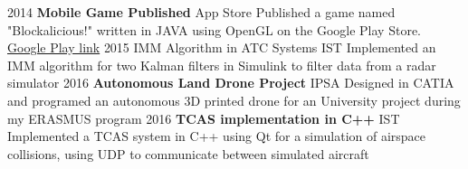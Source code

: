 \documentclass[]{friggeri-cv} %
\begin{document}
\begin{entrylist}


\entry
{2014}
{\textbf{Mobile Game Published}}
{App Store}
{Published a game named "Blockalicious!" written in JAVA using OpenGL on the Google Play Store. 
\href{https://play.google.com/store/apps/details?id=com.guiero.blockaliciousfinal}{Google Play link}}
\entry
{2015}
{IMM Algorithm in ATC Systems}
{IST}
{Implemented an IMM algorithm for two Kalman filters in Simulink to filter data from a radar simulator}
\entry
{2016}
{\textbf{Autonomous Land Drone Project}}
{IPSA}
{Designed in CATIA and programed an autonomous 3D printed drone for an University project during my ERASMUS program}
\entry
{2016}
{\textbf{TCAS implementation in C++}}
{IST}
{Implemented a TCAS system in C++ using Qt for a simulation of airspace collisions, using UDP to communicate between simulated aircraft}


\end{entrylist}





\end{document}
